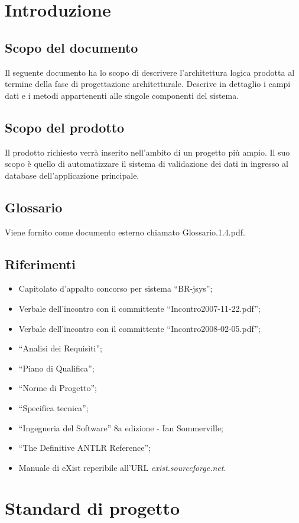 \documentclass[11pt,titlepage,a4paper]{report}
\begin{document}
\tableofcontents 

\chapter{Introduzione}
\section{Scopo del documento}
Il seguente documento ha lo scopo di descrivere l'architettura logica prodotta al termine della fase di progettazione architetturale. Descrive in dettaglio i campi dati e i metodi appartenenti alle singole componenti del sistema.
\section{Scopo del prodotto}
Il prodotto richiesto verr\`a inserito nell'ambito di un progetto pi\`u ampio. Il suo scopo \`e quello di automatizzare il sistema di validazione dei dati in ingresso al database dell'applicazione principale.

\section{Glossario}
Viene fornito come documento esterno chiamato Glossario.1.4.pdf.

\section{Riferimenti}
\begin{itemize}
\item Capitolato d'appalto concorso per sistema ``BR-jsys'';
\item Verbale dell'incontro con il committente ``Incontro2007-11-22.pdf'';
\item Verbale dell'incontro con il committente ``Incontro2008-02-05.pdf'';
\item ``Analisi dei Requisiti'';
\item ``Piano di Qualifica'';
\item ``Norme di Progetto'';
\item ``Specifica tecnica'';
\item ``Ingegneria del Software'' 8a edizione - Ian Sommerville;
\item ``The Definitive ANTLR Reference'';
\item Manuale di eXist reperibile all'URL \textit{exist.sourceforge.net}.
\end{itemize}
\chapter{Standard di progetto}
\end{document}

